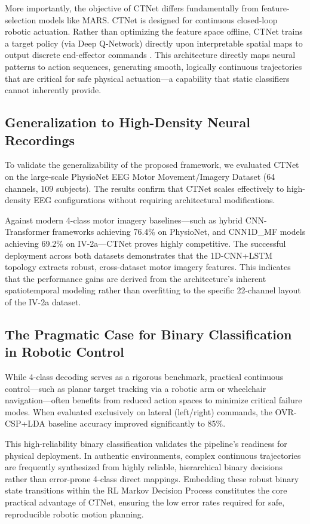 \documentclass[twocolumn]{article}
\begin{document}
More importantly, the objective of CTNet differs fundamentally from feature-selection models like MARS. CTNet is designed for continuous closed-loop robotic actuation. Rather than optimizing the feature space offline, CTNet trains a target policy (via Deep Q-Network) directly upon interpretable spatial maps to output discrete end-effector commands \cite{nallani2024rleegnet}. This architecture directly maps neural patterns to action sequences, generating smooth, logically continuous trajectories that are critical for safe physical actuation---a capability that static classifiers cannot inherently provide.

\subsection{Generalization to High-Density Neural Recordings}

To validate the generalizability of the proposed framework, we evaluated CTNet on the large-scale PhysioNet EEG Motor Movement/Imagery Dataset (64 channels, 109 subjects). The results confirm that CTNet scales effectively to high-density EEG configurations without requiring architectural modifications.

Against modern 4-class motor imagery baselines---such as hybrid CNN-Transformer frameworks achieving 76.4\% on PhysioNet, and CNN1D\_MF models achieving 69.2\% on IV-2a---CTNet proves highly competitive. The successful deployment across both datasets demonstrates that the 1D-CNN+LSTM topology extracts robust, cross-dataset motor imagery features. This indicates that the performance gains are derived from the architecture's inherent spatiotemporal modeling rather than overfitting to the specific 22-channel layout of the IV-2a dataset.

\subsection{The Pragmatic Case for Binary Classification in Robotic Control}

While 4-class decoding serves as a rigorous benchmark, practical continuous control---such as planar target tracking via a robotic arm or wheelchair navigation---often benefits from reduced action spaces to minimize critical failure modes. When evaluated exclusively on lateral (left/right) commands, the OVR-CSP+LDA baseline accuracy improved significantly to 85\%.

This high-reliability binary classification validates the pipeline's readiness for physical deployment. In authentic environments, complex continuous trajectories are frequently synthesized from highly reliable, hierarchical binary decisions rather than error-prone 4-class direct mappings. Embedding these robust binary state transitions within the RL Markov Decision Process constitutes the core practical advantage of CTNet, ensuring the low error rates required for safe, reproducible robotic motion planning.
\end{document}
